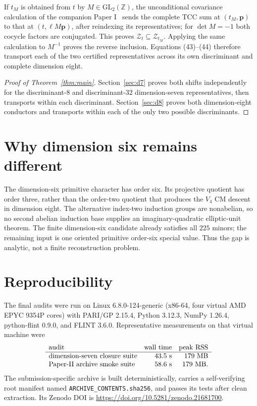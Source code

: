 \documentclass[11pt]{article}
\newcommand{\Z}{\mathbb Z}
\begin{document}
If $t_M$ is obtained from $t$ by $M\in\mathrm{GL}_2(\Z)$, the
unconditional covariance calculation of the companion
Paper I~\cite{ZhaoI} sends
the complete TCC sum at $(t_M,\boldsymbol p)$ to that at
$(t,\ell M\boldsymbol p)$, after reindexing its representatives; for
$\det M=-1$ both cocycle factors are conjugated.  This proves
$\mathcal Z_t\subseteq\mathcal Z_{t_M}$.  Applying the same calculation
to $M^{-1}$ proves the reverse inclusion.  Equations
\textup{(43)}--\textup{(44)} therefore transport each of the two
certified representatives across its own discriminant and complete
dimension eight.

\begin{proof}[Proof of Theorem~\ref{thm:main}]
Section~\ref{sec:d7} proves both shifts independently for the
discriminant-$8$ and discriminant-$32$ dimension-seven
representatives, then transports within each discriminant.
Section~\ref{sec:d8} proves both dimension-eight conductors and
transports within each of the only two possible discriminants.
\end{proof}

\section{Why dimension six remains different}

The dimension-six primitive character has order six.  Its projective
quotient has order three, rather than the order-two quotient that
produces the $V_4$ CM descent in dimension eight.  The alternative
index-two induction groups are nonabelian, so no second abelian
induction base supplies an imaginary-quadratic elliptic-unit theorem.
The finite dimension-six candidate already satisfies all $225$ minors;
the remaining input is one oriented primitive order-six special value.
Thus the gap is analytic, not a finite reconstruction problem.

\section{Reproducibility}

The final audits were run on Linux 6.8.0-124-generic (x86-64, four
virtual AMD EPYC 9354P cores) with PARI/GP 2.15.4,
Python 3.12.3, NumPy 1.26.4, python-flint 0.9.0, and FLINT 3.6.0.
Representative measurements on that virtual machine were
\[
\begin{array}{lrr}
\text{audit}&\text{wall time}&\text{peak RSS}\\ \hline
\text{dimension-seven closure suite}&43.5\ {\rm s}&179\ {\rm MB}\\
\text{Paper-II archive smoke suite}&58.6\ {\rm s}&179\ {\rm MB}.
\end{array}
\]
The submission-specific archive is built deterministically, carries a
self-verifying root manifest named
\texttt{ARCHIVE\_CONTENTS.sha256}, and passes its tests after clean
extraction. Its Zenodo DOI is
\url{https://doi.org/10.5281/zenodo.21681700}.
\end{document}
